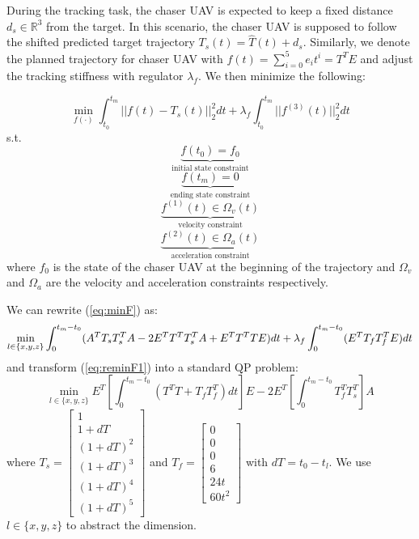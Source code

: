 During the tracking task, the chaser UAV is expected to keep a fixed distance $d_s\in\mathbb{R}^{3}$ from the target. In this scenario, the chaser UAV is supposed to follow the shifted predicted target trajectory $T_s(t)=\hat{T}(t)+d_s$. Similarly, we denote the planned trajectory for chaser UAV with $f(t)=\sum^5_{i=0} e_{i}t^i=T^TE$ and adjust the tracking stiffness with regulator $\lambda_f$. We then minimize the following:

\begin{equation}\label{eq:minF}
\min_{f(\cdot)} \int_{t_0}^{t_m} ||f(t)-T_s(t)||^2_{2}dt + \lambda_f\int_{t_0}^{t_m} ||f^{(3)}(t)||^2_{2}dt
\end{equation}
\indent s.t.
\begin{equation}
\underbrace{f(t_0)=f_0}_{\text{initial state constraint}}
\end{equation}
\begin{equation}
\underbrace{f(t_m)=0}_{\text{ending state constraint}}
\end{equation}
\begin{equation}
\underbrace{f^{(1)}(t) \in \Omega_{v}(t)}_{\text{velocity constraint}}
\end{equation}
\begin{equation}
\underbrace{f^{(2)}(t) \in \Omega_{a}(t)}_{\text{acceleration constraint}}
\end{equation}
\noindent
where $f_0$ is the state of the chaser UAV at the beginning of the trajectory and $\Omega_v$ and $\Omega_a$ are the velocity and acceleration constraints respectively.

We can rewrite (\ref{eq:minF}) as:
\begin{equation}\label{eq:reminF1}
\min_{l\in\{x,y,z\}}\int_{0}^{t_m-t_0} (A^TT_sT_s^TA-2E^TT^TT_s^TA+E^TT^TTE)dt + \lambda_f\int_{0}^{t_m-t_0} (E^TT_fT_f^TE)dt\\
\end{equation}
\noindent
and transform (\ref{eq:reminF1}) into a standard QP problem:
\begin{equation}\label{eq:reminF2}
\min_{l\in\{x,y,z\}}E^T[\int_{0}^{t_m-t_0}(T^TT+T_fT_f^T)dt]E-2E^T[\int_{0}^{t_m-t_0}T_f^TT_s^T]A
\end{equation}
\noindent
where $T_s = \begin{bmatrix}1\\1+dT\\(1+dT)^2\\(1+dT)^3\\(1+dT)^4\\(1+dT)^5\end{bmatrix}$ and $T_f=\begin{bmatrix}0\\0\\0\\6\\24t\\60t^2\end{bmatrix}$ with $dT=t_0-t_l$. We use $l\in\{x,y,z\}$ to abstract the dimension.

\newpage
